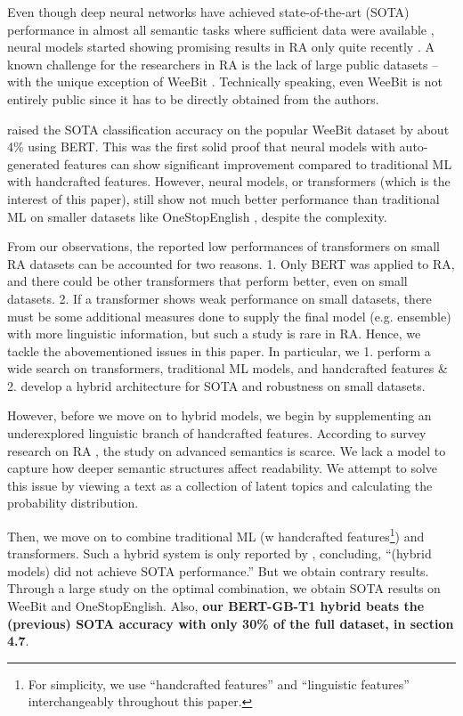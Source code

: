 \documentclass[11pt]{article}
\begin{document}
Even though deep neural networks have achieved state-of-the-art (SOTA) performance in almost all semantic tasks where sufficient data were available \citep{colbert:11, Zhang:15}, neural models started showing promising results in RA only quite recently \citep{Martinc:21}. A known challenge for the researchers in RA is the lack of large public datasets -- with the unique exception of WeeBit \citep{Vajjala:12}. Technically speaking, even WeeBit is not entirely public since it has to be directly obtained from the authors.

\citet{Martinc:21} raised the SOTA classification accuracy on the popular WeeBit dataset \citep{Vajjala:12} by about 4\% using BERT. This was the first solid proof that neural models with auto-generated features can show significant improvement compared to traditional ML with handcrafted features. However, neural models, or transformers (which is the interest of this paper), still show not much better performance than traditional ML on smaller datasets like OneStopEnglish \citep{Vajjala:18}, despite the complexity. 

From our observations, the reported low performances of transformers on small RA datasets can be accounted for two reasons. 1. Only BERT was applied to RA, and there could be other transformers that perform better, even on small datasets. 2. If a transformer shows weak performance on small datasets, there must be some additional measures done to supply the final model (e.g. ensemble) with more linguistic information, but such a study is rare in RA. Hence, we tackle the abovementioned issues in this paper. In particular, we 1. perform a wide search on transformers, traditional ML models, and handcrafted features \& 2. develop a hybrid architecture for SOTA and robustness on small datasets.

However, before we move on to hybrid models, we begin by supplementing an underexplored linguistic branch of handcrafted features. According to survey research on RA \citep{Collins-Thompson:14}, the study on advanced semantics is scarce. We lack a model to capture how deeper semantic structures affect readability. We attempt to solve this issue by viewing a text as a collection of latent topics and calculating the probability distribution.

Then, we move on to combine traditional ML (w handcrafted features\footnote{For simplicity, we use ``handcrafted features'' and ``linguistic features'' interchangeably throughout this paper.}) and transformers. Such a hybrid system is only reported by \citet{deutsch-etal-2020-linguistic}, concluding, ``(hybrid models) did not achieve SOTA performance.'' But we obtain contrary results. Through a large study on the optimal combination, we obtain SOTA results on WeeBit and OneStopEnglish. Also, \textbf{our BERT-GB-T1 hybrid beats the (previous) SOTA accuracy with only 30\% of the full dataset, in section 4.7}.
\end{document}
